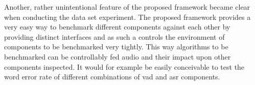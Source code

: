 Another, rather unintentional feature of the proposed framework became clear when conducting the data set experiment.
The proposed framework provides a very easy way to benchmark different components against each other by providing distinct interfaces and as such a controls the environment of components to be benchmarked very tightly.
This way algorithms to be benchmarked can be controllably fed audio and their impact upon other components inspected.
It would for example be easily conceivable to test the word error rate of different combinations of \gls{vad} and \gls{asr} components.
